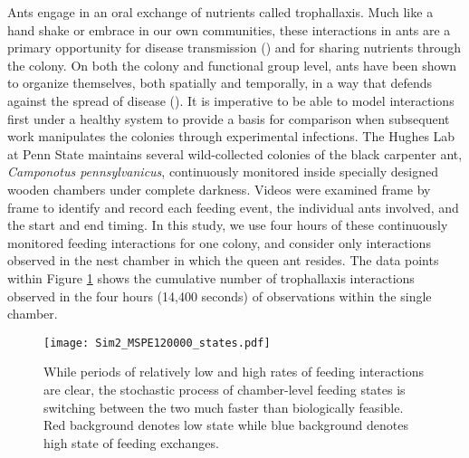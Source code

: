 \documentclass[ba]{imsart}
\begin{document}
Ants engage in an oral exchange of nutrients called trophallaxis. Much like a hand shake or embrace in our own communities, these interactions in ants are a primary opportunity for disease transmission (\cite{Naug2002}) and for sharing nutrients through the colony. On both the colony and functional group level, ants have been shown to organize themselves, both spatially and temporally, in a way that defends against the spread of disease (\cite{Quevillon2015}). It is imperative to be able to model interactions first under a healthy system to provide a basis for comparison when subsequent work manipulates the colonies through experimental infections. The Hughes Lab at Penn State maintains several wild-collected colonies of the black carpenter ant, \textit{Camponotus pennsylvanicus}, continuously monitored inside specially designed wooden chambers under complete darkness. Videos were examined frame by frame to identify and record each feeding event, the individual ants involved, and the start and end timing. In this study, we use four hours of these continuously monitored feeding interactions for one colony, and consider only interactions observed in the nest chamber in which the queen ant resides. The data points within Figure \ref{f:simplestates} shows the cumulative number of trophallaxis interactions observed in the four hours (14,400 seconds) of observations within the single chamber.

\begin{figure}
 \centerline{\texttt{[image: Sim2\_MSPE120000\_states.pdf]}}
\caption{While periods of relatively low and high rates of feeding interactions are clear, the stochastic process of chamber-level feeding states is switching between the two much faster than biologically feasible. Red background denotes low state while blue background denotes high state of feeding exchanges.}
\label{f:simplestates}
\end{figure}
\end{document}
